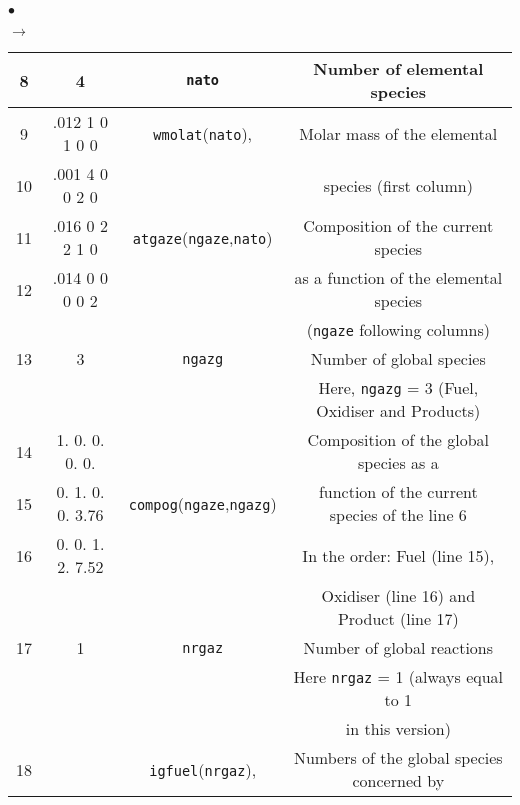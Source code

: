 {{\begin{list}{$\bullet$}{}
\begin{list}{$\rightarrow$}{}
\begin{table}[htbp]
\begin{center}
{\begin{tabular}{|c|c|c|c|}
  8     &         4         &  \texttt{nato\index{nato}}   & Number of elemental species                      \\ \hline
  9     &.012  1  0  1  0  0& \texttt{wmolat\index{wmolat}}(\texttt{nato}),  & Molar mass of the elemental                      \\
 10     &.001  4  0  0  2  0&                              & species (first column)                           \\
 11     &.016  0  2  2  1  0&\texttt{atgaze\index{atgaze}}(\texttt{ngaze},\texttt{nato})& Composition of the current species             \\
 12     &.014  0  0  0  0  2&                              & as a function of the elemental species           \\
        &                   &                              & (\texttt{ngaze} following columns)                        \\ \hline
 13     &         3         &  \texttt{ngazg\index{ngazg}} & Number of global species                         \\
        &                   &                              & Here, \texttt{ngazg} = 3 (Fuel, Oxidiser and Products)    \\ \hline
 14     &  1. 0. 0. 0. 0.   &                              & Composition of the global species as a           \\
 15     &  0. 1. 0. 0. 3.76 &\texttt{compog\index{compog}}(\texttt{ngaze},\texttt{ngazg})& function of the current species of the line 6 \\
 16     &  0. 0. 1. 2. 7.52 &                              & In the order: Fuel (line 15),                    \\
        &                   &                              & Oxidiser (line 16) and Product (line 17)         \\ \hline
 17     &         1         &  \texttt{nrgaz\index{nrgaz}} & Number of global reactions                       \\
        &                   &                              & Here \texttt{nrgaz} = 1 (always equal to 1                \\
        &                   &                              & in this version)                                 \\ \hline
 18     &                   & \texttt{igfuel\index{igfuel}}(\texttt{nrgaz}), & Numbers of the global species concerned by       \\

\end{tabular}}
\end{center}
\end{table}
\end{list}
\end{list}}}

